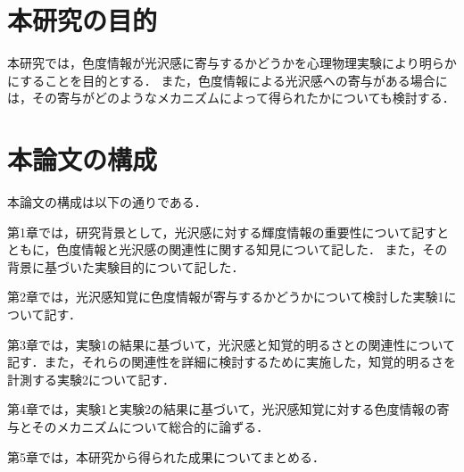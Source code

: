     \section{本研究の目的}
        本研究では，色度情報が光沢感に寄与するかどうかを心理物理実験により明らかにすることを目的とする．
        また，色度情報による光沢感への寄与がある場合には，その寄与がどのようなメカニズムによって得られたかについても検討する．

    \section{本論文の構成}
        本論文の構成は以下の通りである．

        第1章では，研究背景として，光沢感に対する輝度情報の重要性について記すとともに，色度情報と光沢感の関連性に関する知見について記した．
        また，その背景に基づいた実験目的について記した．

        第2章では，光沢感知覚に色度情報が寄与するかどうかについて検討した実験1について記す．

        第3章では，実験1の結果に基づいて，光沢感と知覚的明るさとの関連性について記す．また，それらの関連性を詳細に検討するために実施した，知覚的明るさを計測する実験2について記す．

        第4章では，実験1と実験2の結果に基づいて，光沢感知覚に対する色度情報の寄与とそのメカニズムについて総合的に論ずる．

        第5章では，本研究から得られた成果についてまとめる．

    \newpage